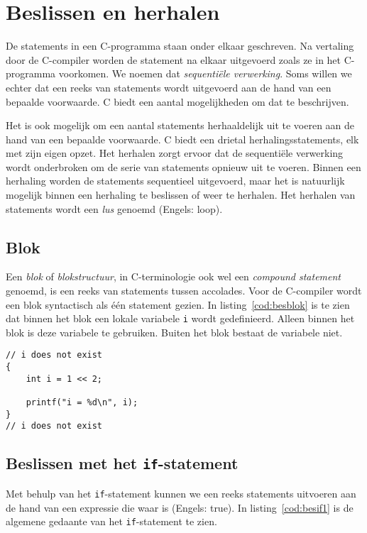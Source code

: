 \chapter{Beslissen en herhalen}
\label{cha:programmabesturing}
\thispagestyle{empty}

De statements in een C-programma staan onder elkaar geschreven. Na vertaling door de C-compiler worden de statement na elkaar uitgevoerd zoals ze in het C-programma voorkomen. We noemen dat \textsl{sequentiële verwerking}. Soms willen we echter dat een reeks van statements wordt uitgevoerd aan de hand van een bepaalde voorwaarde. C biedt een aantal mogelijkheden om dat te beschrijven.

Het is ook mogelijk om een aantal statements herhaaldelijk uit te voeren aan de hand van een bepaalde voorwaarde. C biedt een drietal herhalingsstatements, elk met zijn eigen opzet. Het herhalen zorgt ervoor dat de sequentiële verwerking wordt onderbroken om de serie van statements opnieuw uit te voeren. Binnen een herhaling worden de statements sequentieel uitgevoerd, maar het is natuurlijk mogelijk binnen een herhaling te beslissen of weer te herhalen. Het herhalen van statements wordt een \textsl{lus} genoemd (Engels: loop).


\section{Blok}
Een \textsl{blok} of \textsl{blokstructuur}, in C-terminologie ook wel een \textsl{compound statement} genoemd, is een reeks van statements tussen accolades. Voor de C-compiler wordt een blok syntactisch als één statement gezien. In listing~\ref{cod:besblok} is te zien dat binnen het blok een lokale variabele \texttt{i} wordt gedefinieerd. Alleen binnen het blok is deze variabele te gebruiken. Buiten het blok bestaat de variabele niet.


\begin{lstlisting}[caption=Een blok met een lokale variabele.,label=cod:besblok]
// i does not exist
{
    int i = 1 << 2;
    
    printf("i = %d\n", i);
}
// i does not exist
\end{lstlisting}


\section{Beslissen met het \texttt{if}-statement}
Met behulp van het \texttt{if}-statement kunnen we een reeks statements uitvoeren aan de hand van een expressie die waar is (Engels: true). In listing~\ref{cod:besif1} is de algemene gedaante van het \texttt{if}-statement te zien.

